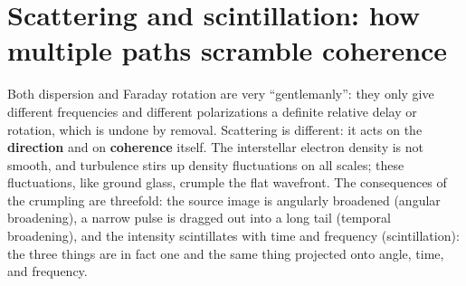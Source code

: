 \section{Scattering and scintillation: how multiple paths scramble coherence}
\label{sec:e21-scattering}

Both dispersion and Faraday rotation are very ``gentlemanly'': they only give different frequencies and different polarizations a definite relative delay or rotation, which is undone by removal. Scattering is different: it acts on the \textbf{direction} and on \textbf{coherence} itself. The interstellar electron density is not smooth, and turbulence stirs up density fluctuations on all scales; these fluctuations, like ground glass, crumple the flat wavefront. The consequences of the crumpling are threefold: the source image is angularly broadened (angular broadening), a narrow pulse is dragged out into a long tail (temporal broadening), and the intensity scintillates with time and frequency (scintillation): the three things are in fact one and the same thing projected onto angle, time, and frequency.

